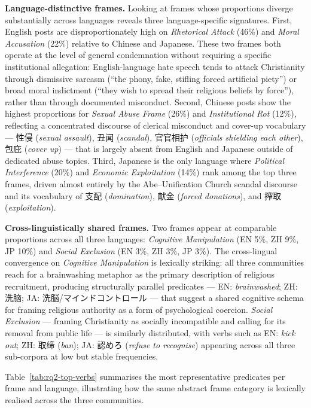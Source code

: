 \documentclass[../CLthesis.tex]{subfiles}
\begin{document}
\textbf{Language-distinctive frames.}
Looking at frames whose proportions diverge substantially across languages reveals three language-specific signatures. First, English posts are disproportionately high on \textit{Rhetorical Attack} (46\%) and \textit{Moral Accusation} (22\%) relative to Chinese and Japanese. These two frames both operate at the level of general condemnation without requiring a specific institutional allegation: English-language hate speech tends to attack Christianity through dismissive sarcasm (``the phony, fake, stifling forced artificial piety'') or broad moral indictment (``they wish to spread their religious beliefs by force''), rather than through documented misconduct. Second, Chinese posts show the highest proportions for \textit{Sexual Abuse Frame} (26\%) and \textit{Institutional Rot} (12\%), reflecting a concentrated discourse of clerical misconduct and cover-up vocabulary --- 性侵 (\textit{sexual assault}), 丑闻 (\textit{scandal}), 官官相护 (\textit{officials shielding each other}), 包庇 (\textit{cover up}) --- that is largely absent from English and Japanese outside of dedicated abuse topics. Third, Japanese is the only language where \textit{Political Interference} (20\%) and \textit{Economic Exploitation} (14\%) rank among the top three frames, driven almost entirely by the Abe--Unification Church scandal discourse and its vocabulary of 支配 (\textit{domination}), 献金 (\textit{forced donations}), and 搾取 (\textit{exploitation}).

\textbf{Cross-linguistically shared frames.}
Two frames appear at comparable proportions across all three languages: \textit{Cognitive Manipulation} (EN 5\%, ZH 9\%, JP 10\%) and \textit{Social Exclusion} (EN 3\%, ZH 3\%, JP 3\%). The cross-lingual convergence on \textit{Cognitive Manipulation} is lexically striking: all three communities reach for a brainwashing metaphor as the primary description of religious recruitment, producing structurally parallel predicates --- EN: \textit{brainwashed}; ZH: 洗脑; JA: 洗脳/マインドコントロール --- that suggest a shared cognitive schema for framing religious authority as a form of psychological coercion. \textit{Social Exclusion} --- framing Christianity as socially incompatible and calling for its removal from public life --- is similarly distributed, with verbs such as EN: \textit{kick out}; ZH: 取缔 (\textit{ban}); JA: 認めろ (\textit{refuse to recognise}) appearing across all three sub-corpora at low but stable frequencies.

Table~\ref{tab:rq2-top-verbs} summarises the most representative predicates per frame and language, illustrating how the same abstract frame category is lexically realised across the three communities.
\end{document}
